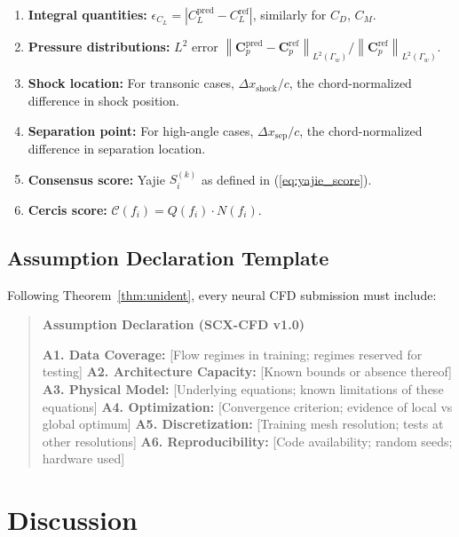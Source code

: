 \documentclass[11pt,a4paper]{article}
\theoremstyle{definition}
\theoremstyle{remark}
\newcommand{\norm}[1]{\left\lVert#1\right\rVert}
\begin{document}
\begin{enumerate}[label=(\roman*)]
    \item \textbf{Integral quantities:} $\epsilon_{C_L} = |C_L^{\text{pred}} - C_L^{\text{ref}}|$, similarly for $C_D$, $C_M$.
    \item \textbf{Pressure distributions:} $L^2$ error $\norm{\mathbf{C}_p^{\text{pred}} - \mathbf{C}_p^{\text{ref}}}_{L^2(\Gamma_w)} / \norm{\mathbf{C}_p^{\text{ref}}}_{L^2(\Gamma_w)}$.
    \item \textbf{Shock location:} For transonic cases, $\Delta x_{\text{shock}} / c$, the chord-normalized difference in shock position.
    \item \textbf{Separation point:} For high-angle cases, $\Delta x_{\text{sep}} / c$, the chord-normalized difference in separation location.
    \item \textbf{Consensus score:} Yajie $S_i^{(k)}$ as defined in (\ref{eq:yajie_score}).
    \item \textbf{Cercis score:} $\mathcal{C}(f_i) = Q(f_i) \cdot N(f_i)$.
\end{enumerate}

\subsection{Assumption Declaration Template}

Following Theorem~\ref{thm:unident}, every neural CFD submission must include:

\begin{quote}
\textbf{Assumption Declaration (SCX-CFD v1.0)}

\noindent \textbf{A1. Data Coverage:} [Flow regimes in training; regimes reserved for testing]
\noindent \textbf{A2. Architecture Capacity:} [Known bounds or absence thereof]
\noindent \textbf{A3. Physical Model:} [Underlying equations; known limitations of these equations]
\noindent \textbf{A4. Optimization:} [Convergence criterion; evidence of local vs global optimum]
\noindent \textbf{A5. Discretization:} [Training mesh resolution; tests at other resolutions]
\noindent \textbf{A6. Reproducibility:} [Code availability; random seeds; hardware used]
\end{quote}

\section{Discussion}
\end{document}
